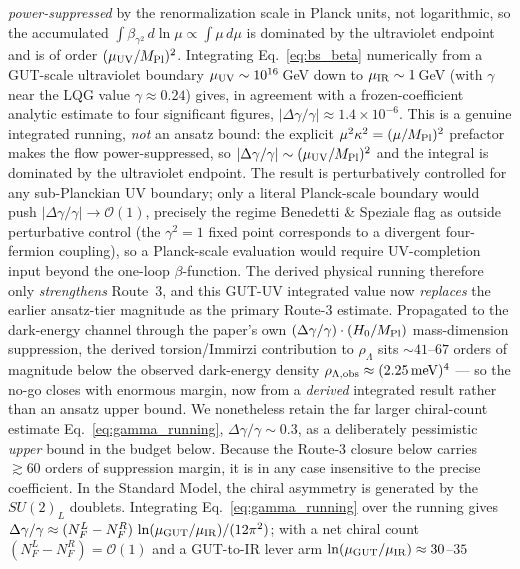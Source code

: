 \documentclass[aps,prd,twocolumn,superscriptaddress,showpacs,preprintnumbers,nofootinbib,longbibliography,floatfix]{revtex4-2}
\begin{document}
\emph{power-suppressed} by the renormalization scale in Planck units, not
logarithmic, so the accumulated $\int\!\beta_{\gamma^2}\,d\ln\mu \propto
\int\!\mu\,d\mu$ is dominated by the ultraviolet endpoint and is of order
$(\mu_{\rm UV}/M_{\rm Pl})^2$. Integrating Eq.~\eqref{eq:bs_beta}
numerically from a GUT-scale ultraviolet boundary
$\mu_{\rm UV}\sim10^{16}\,$GeV down to $\mu_{\rm IR}\sim1\,$GeV (with
$\gamma$ near the LQG value $\gamma\!\approx\!0.24$) gives, in agreement
with a frozen-coefficient analytic estimate to four significant figures,
$|\Delta\gamma/\gamma|\approx1.4\times10^{-6}$. This is a genuine integrated
running, \emph{not} an ansatz bound: the explicit
$\mu^2\kappa^2=(\mu/M_{\rm Pl})^2$ prefactor makes the flow power-suppressed,
so $|\Delta\gamma/\gamma|\sim(\mu_{\rm UV}/M_{\rm Pl})^2$ and the integral is
dominated by the ultraviolet endpoint. The result is perturbatively
controlled for any sub-Planckian UV boundary; only a literal Planck-scale
boundary would push $|\Delta\gamma/\gamma|\to\mathcal{O}(1)$, precisely the
regime Benedetti \& Speziale flag as outside perturbative control (the
$\gamma^2=1$ fixed point corresponds to a divergent four-fermion coupling),
so a Planck-scale evaluation would require UV-completion input beyond the
one-loop $\beta$-function. The derived physical running therefore only
\emph{strengthens} Route~3, and this GUT-UV integrated value now
\emph{replaces} the earlier ansatz-tier magnitude as the primary Route-3
estimate. Propagated to the dark-energy channel through the paper's own
$(\Delta\gamma/\gamma)\cdot(H_0/M_{\rm Pl})$ mass-dimension suppression, the
derived torsion/Immirzi contribution to $\rho_\Lambda$ sits
$\sim 41$--$67$ orders of magnitude below the observed dark-energy density
$\rho_{\Lambda,\rm obs}\approx(2.25\,\text{meV})^4$ --- so the no-go closes
with enormous margin, now from a \emph{derived} integrated result rather
than an ansatz upper bound. We nonetheless retain the far larger
chiral-count estimate Eq.~\eqref{eq:gamma_running},
$\Delta\gamma/\gamma\!\sim\!0.3$, as a deliberately pessimistic \emph{upper}
bound in the budget below. Because the Route-3
closure below carries $\gtrsim 60$ orders of suppression margin, it is
in any case insensitive to the precise coefficient. In the Standard Model, the chiral
asymmetry is generated by the $SU(2)_L$ doublets. Integrating
Eq.~\eqref{eq:gamma_running} over the running gives
$\Delta\gamma/\gamma \approx (N_F^L-N_F^R)\,
\ln(\mu_{\rm GUT}/\mu_{\rm IR})/(12\pi^2)$; with a net chiral count
$(N_F^L-N_F^R)=\mathcal{O}(1)$ and a GUT-to-IR lever arm
$\ln(\mu_{\rm GUT}/\mu_{\rm IR})\approx 30$--$35$
\end{document}
